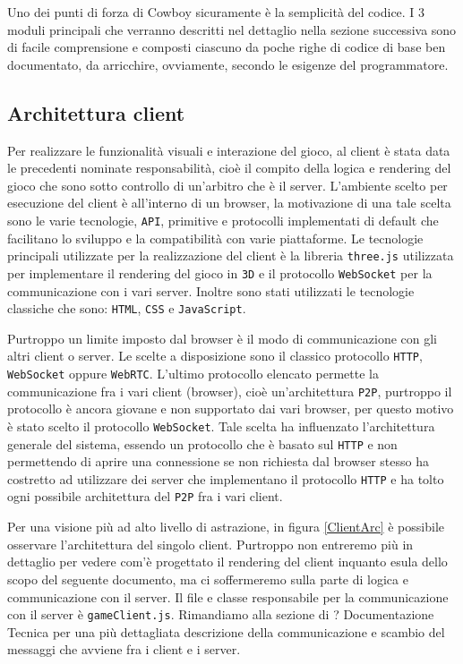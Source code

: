 \documentclass[paper=a4, fontsize=11pt]{scrartcl} %
\numberwithin{equation}{section} %
\numberwithin{figure}{section} %
\numberwithin{table}{section} %
\begin{document}
Uno dei punti di forza di Cowboy sicuramente è la semplicità del codice. I 3 moduli principali che verranno descritti nel dettaglio nella sezione successiva sono di facile comprensione e composti ciascuno da poche righe di codice di base ben documentato, da arricchire, ovviamente, secondo le esigenze del programmatore.

\subsection{Architettura client}
Per realizzare le funzionalità visuali e interazione del gioco, al client è stata data le precedenti nominate responsabilità, cioè il compito della logica e rendering del gioco che sono sotto controllo di un'arbitro che è il server.
L'ambiente scelto per esecuzione del client è all'interno di un browser, la motivazione di una tale scelta sono le varie tecnologie, \texttt{API}, primitive e protocolli
implementati di default che facilitano lo sviluppo e la compatibilità con varie piattaforme. Le tecnologie principali utilizzate per la realizzazione del client è la libreria
\texttt{three.js} \cite{threejs} utilizzata per implementare il rendering del gioco in \texttt{3D} e il protocollo \texttt{WebSocket} \cite{websocket} per la communicazione con i vari server.
Inoltre sono stati utilizzati le tecnologie classiche che sono: \texttt{HTML}, \texttt{CSS} e \texttt{JavaScript}.


Purtroppo un limite imposto dal browser è il modo di communicazione con gli altri client o server. Le scelte a disposizione sono il classico protocollo \texttt{HTTP}, \texttt{WebSocket} oppure \texttt{WebRTC}. L'ultimo protocollo elencato permette la communicazione fra i vari client (browser), cioè un'architettura \texttt{P2P}, purtroppo il
protocollo è ancora giovane e non supportato dai vari browser, per questo motivo è stato scelto il protocollo \texttt{WebSocket}. Tale scelta ha influenzato l'architettura
generale del sistema, essendo un protocollo che è basato sul \texttt{HTTP} e non permettendo di aprire una connessione se non richiesta dal browser stesso ha costretto
ad utilizzare dei server che implementano il protocollo \texttt{HTTP} e ha tolto ogni possibile architettura del \texttt{P2P} fra i vari client.


Per una visione più ad alto livello di astrazione, in figura \ref{ClientArc} è possibile osservare l'architettura del singolo client.
Purtroppo non entreremo più in dettaglio per vedere com'è progettato il rendering del client inquanto esula dello scopo del seguente documento, 
ma ci soffermeremo sulla parte di logica e communicazione con il server. Il file e classe responsabile per la communicazione con il server è \texttt{gameClient.js}.
Rimandiamo alla sezione di ? Documentazione Tecnica per una più dettagliata descrizione della communicazione e scambio del messaggi che avviene fra i client e i server.
\end{document}
